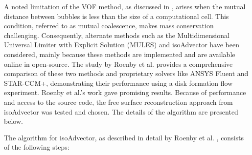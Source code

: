 A noted limitation of the VOF method, as discussed in \cite{hirt1981vof}, arises when the mutual distance between bubbles is less than the size of a computational cell. This condition, referred to as mutual coalescence, makes mass conservation challenging. Consequently, alternate methods such as the Multidimensional Universal Limiter with Explicit Solution (MULES) \cite{zalesak1979fully} and isoAdvector \cite{roenby2019isoadvector} have been considered, mainly because these methods are implemented and are available online in open-source. The study by Roenby et al. \cite{roenby2019isoadvector} provides a comprehensive comparison of these two methods and proprietary solvers like ANSYS Fluent and STAR-CCM+, demonstrating their performance using a disk formation flow experiment. Roenby et al.'s work \cite{roenby2019isoadvector} gave promising results. Because of performance and access to the source code, the free surface reconstruction approach from isoAdvector was tested and chosen. The details of the algorithm are presented below.

The algorithm for isoAdvector, as described in detail by Roenby et al. \cite{roenby2019isoadvector}, consists of the following steps:
 
